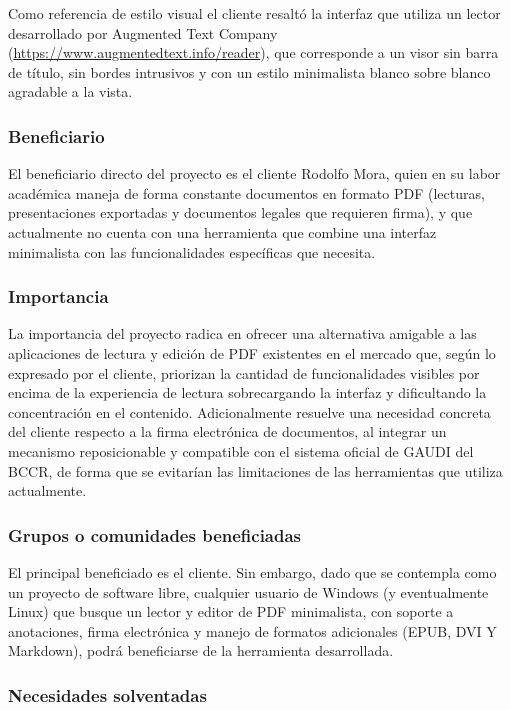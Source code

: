 Como referencia de estilo visual el cliente resaltó la interfaz que utiliza un lector desarrollado por Augmented Text Company (\url{https://www.augmentedtext.info/reader}), que corresponde a un visor sin barra de título, sin bordes intrusivos y con un estilo minimalista blanco sobre blanco agradable a la vista.

\subsubsection{Beneficiario}
El beneficiario directo del proyecto es el cliente Rodolfo Mora, quien en su labor académica maneja de forma constante documentos en formato PDF (lecturas, presentaciones exportadas y documentos legales que requieren firma), y que actualmente no cuenta con una herramienta
que combine una interfaz minimalista con las funcionalidades específicas que necesita.

\subsubsection{Importancia}
La importancia del proyecto radica en ofrecer una alternativa amigable a las aplicaciones de lectura y edición de PDF existentes en el mercado que, según lo expresado por el cliente, priorizan la cantidad de funcionalidades visibles por encima de la experiencia de lectura sobrecargando la interfaz y dificultando la concentración en el contenido. Adicionalmente resuelve una necesidad concreta del cliente respecto a la firma electrónica de documentos, al integrar un mecanismo reposicionable y compatible con el sistema oficial de GAUDI del BCCR, de forma que se evitarían las limitaciones de las herramientas que utiliza actualmente.

\subsubsection{Grupos o comunidades beneficiadas}

El principal beneficiado es el cliente. Sin embargo, dado que se contempla como un proyecto de software libre, cualquier usuario de Windows (y eventualmente Linux) que busque un lector y editor de PDF minimalista, con soporte a anotaciones, firma electrónica y manejo de formatos adicionales (EPUB, DVI Y Markdown), podrá beneficiarse de la herramienta desarrollada.

\subsubsection{Necesidades solventadas}

